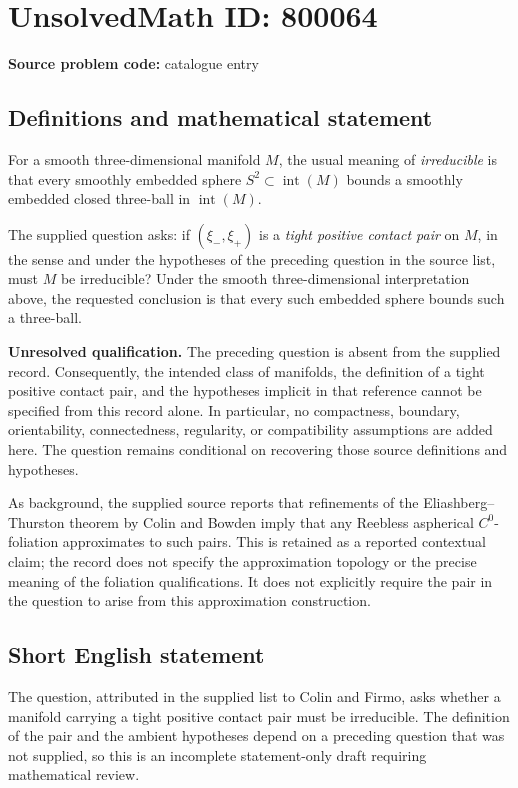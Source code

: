 \documentclass[11pt]{article}
\begin{document}
\section*{UnsolvedMath ID: 800064}
\textbf{Source problem code:} catalogue entry
\subsection{Definitions and mathematical statement}
For a smooth three-dimensional manifold \(M\), the usual meaning of \emph{irreducible} is that every smoothly embedded sphere \(S^2\subset\operatorname{int}(M)\) bounds a smoothly embedded closed three-ball in \(\operatorname{int}(M)\).

The supplied question asks: if \((\xi_-,\xi_+)\) is a \emph{tight positive contact pair} on \(M\), in the sense and under the hypotheses of the preceding question in the source list, must \(M\) be irreducible? Under the smooth three-dimensional interpretation above, the requested conclusion is that every such embedded sphere bounds such a three-ball.

\textbf{Unresolved qualification.} The preceding question is absent from the supplied record. Consequently, the intended class of manifolds, the definition of a tight positive contact pair, and the hypotheses implicit in that reference cannot be specified from this record alone. In particular, no compactness, boundary, orientability, connectedness, regularity, or compatibility assumptions are added here. The question remains conditional on recovering those source definitions and hypotheses.

As background, the supplied source reports that refinements of the Eliashberg--Thurston theorem by Colin and Bowden imply that any Reebless aspherical \(C^0\)-foliation approximates to such pairs. This is retained as a reported contextual claim; the record does not specify the approximation topology or the precise meaning of the foliation qualifications. It does not explicitly require the pair in the question to arise from this approximation construction.
\subsection{Short English statement}
The question, attributed in the supplied list to Colin and Firmo, asks whether a manifold carrying a tight positive contact pair must be irreducible. The definition of the pair and the ambient hypotheses depend on a preceding question that was not supplied, so this is an incomplete statement-only draft requiring mathematical review.
\end{document}
